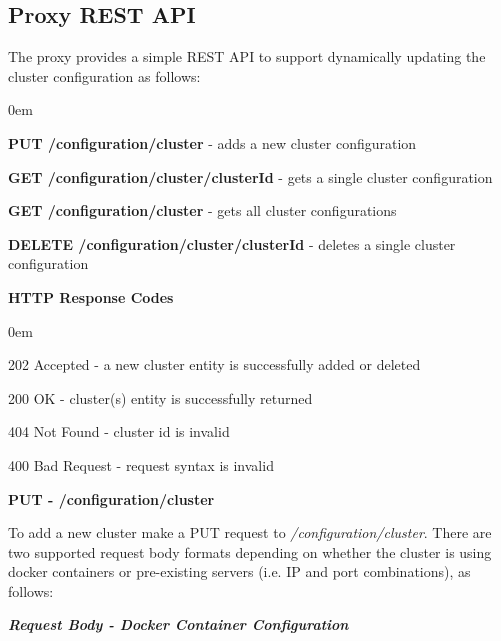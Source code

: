 \documentclass[a4paper,11pt,twoside]{report}
\begin{document}
\begin{appendices}
\chapter[Proxy REST API]{\huge Proxy REST API}\label{Appendix I}
The proxy provides a simple REST API to support dynamically updating the cluster configuration as follows:

\begin{list}{-}{}
  \itemsep0em
  \item \textbf{PUT /configuration/cluster} - adds a new cluster configuration  
 \item\textbf{GET /configuration/cluster/{clusterId}} - gets a single cluster configuration
 \item\textbf{GET /configuration/cluster} - gets all cluster configurations
 \item\textbf{DELETE /configuration/cluster/{clusterId}} - deletes a single cluster configuration
\end{list}

\noindent
\textbf{HTTP Response Codes}
\begin{list}{-}{}
  \itemsep0em
\item 202 Accepted - a new cluster entity is successfully added or deleted 
\item 200 OK - cluster(s) entity is successfully returned   
\item 404 Not Found - cluster id is invalid
\item 400 Bad Request - request syntax is  invalid
\end{list}

\noindent
\textbf{PUT - /configuration/cluster}

\noindent
To add a new cluster make a PUT request to \textit{/configuration/cluster}.  There are two supported request body formats depending on whether the cluster is using docker containers or pre-existing servers (i.e. IP and port combinations), as follows:\bigskip

\noindent
\textit{\textbf{Request Body - Docker Container Configuration}}


\end{appendices}
\end{document}
